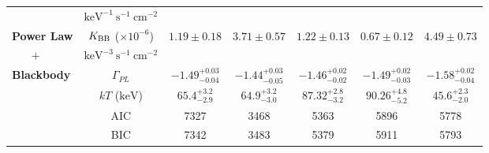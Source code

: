 \documentclass[11pt]{article}
\begin{document}
\begin{table}[htbp]
{\begin{tabular}{l|c|c|c|c|c|c}
        & $\mathrm{keV^{-1}~s^{-1}~cm^{-2}}$ & & &  &  &  \\
        \textbf{Power Law} & $K_{\rm BB}$ ($\times10^{-6}$) &$1.19 \pm 0.18$ & $3.71 \pm 0.57$ & $1.22 \pm 0.13$ & $0.67 \pm 0.12$ & $4.49 \pm 0.73$ \\
        \textbf{$~~~~~~~+$}  & $\mathrm{keV^{-3}~s^{-1}~cm^{-2}}$ && &  &  &  \\
        \textbf{Blackbody} & $\Gamma_{PL}$ &$-1.49^{+0.03}_{-0.04}$& $-1.44^{+0.03}_{-0.05}$ & $-1.46^{+0.02}_{-0.02}$ & $-1.49^{+0.02}_{-0.03}$ & $-1.58^{+0.02}_{-0.04}$ \\
        & $kT$ ($\mathrm{keV}$) &$65.4^{+3.2}_{-2.9}$ & $64.9^{+3.2}_{-3.0}$ & $87.32^{+2.8}_{-3.2}$ & $90.26^{+4.8}_{-5.2}$ & $45.6^{+2.3}_{-2.0}$ \\
        & AIC & 7327 & 3468 & 5363 & 5896 & 5778 \\
        & BIC & 7342 & 3483 & 5379 & 5911 & 5793 \\
    \hline
    \end{tabular}
}
\end{table}
\end{document}
